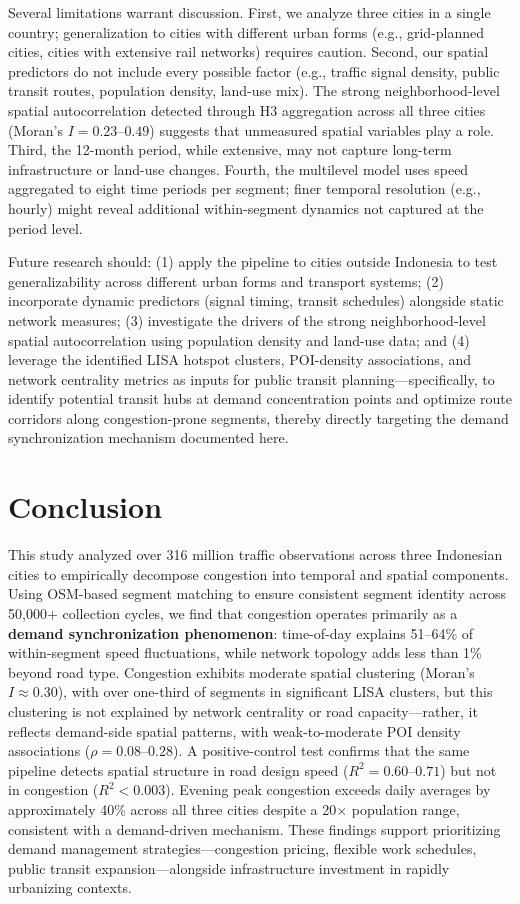 \documentclass[review,authoryear]{elsarticle}
\begin{document}
Several limitations warrant discussion. First, we analyze three cities in a single country; generalization to cities with different urban forms (e.g., grid-planned cities, cities with extensive rail networks) requires caution. Second, our spatial predictors do not include every possible factor (e.g., traffic signal density, public transit routes, population density, land-use mix). The strong neighborhood-level spatial autocorrelation detected through H3 aggregation across all three cities (Moran's $I = 0.23$--$0.49$) suggests that unmeasured spatial variables play a role. Third, the 12-month period, while extensive, may not capture long-term infrastructure or land-use changes. Fourth, the multilevel model uses speed aggregated to eight time periods per segment; finer temporal resolution (e.g., hourly) might reveal additional within-segment dynamics not captured at the period level.

Future research should: (1) apply the pipeline to cities outside Indonesia to test generalizability across different urban forms and transport systems; (2) incorporate dynamic predictors (signal timing, transit schedules) alongside static network measures; (3) investigate the drivers of the strong neighborhood-level spatial autocorrelation using population density and land-use data; and (4) leverage the identified LISA hotspot clusters, POI-density associations, and network centrality metrics as inputs for public transit planning---specifically, to identify potential transit hubs at demand concentration points and optimize route corridors along congestion-prone segments, thereby directly targeting the demand synchronization mechanism documented here.

\section{Conclusion}

This study analyzed over 316 million traffic observations across three Indonesian cities to empirically decompose congestion into temporal and spatial components. Using OSM-based segment matching to ensure consistent segment identity across 50,000+ collection cycles, we find that congestion operates primarily as a \textbf{demand synchronization phenomenon}: time-of-day explains 51--64\% of within-segment speed fluctuations, while network topology adds less than 1\% beyond road type. Congestion exhibits moderate spatial clustering (Moran's $I \approx 0.30$), with over one-third of segments in significant LISA clusters, but this clustering is not explained by network centrality or road capacity---rather, it reflects demand-side spatial patterns, with weak-to-moderate POI density associations ($\rho = 0.08$--$0.28$). A positive-control test confirms that the same pipeline detects spatial structure in road design speed ($R^2 = 0.60$--$0.71$) but not in congestion ($R^2 < 0.003$). Evening peak congestion exceeds daily averages by approximately 40\% across all three cities despite a 20$\times$ population range, consistent with a demand-driven mechanism. These findings support prioritizing demand management strategies---congestion pricing, flexible work schedules, public transit expansion---alongside infrastructure investment in rapidly urbanizing contexts.
\end{document}
